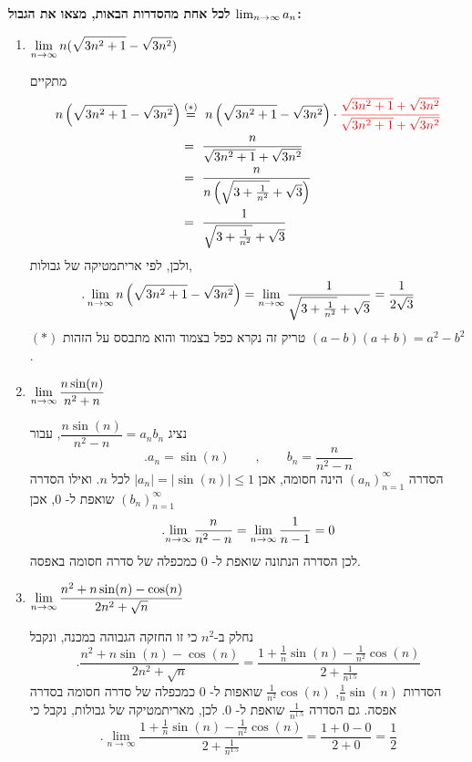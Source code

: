 \textbf{לכל אחת מהסדרות הבאות, מצאו את הגבול
$\lim_{n\to\infty} a_n$:}
\begin{enumerate}
    \item $\displaystyle{\lim_{n\to\infty}n (\sqrt{3n^2+1} - \sqrt{3n^2})}$

\begin{solbox}
    מתקיים
    \begin{align*}
        n\left(\sqrt{3n^2+1} - \sqrt{3n^2}\right)&\overset{(*)}{=}\  n\left(\sqrt{3n^2+1} - \sqrt{3n^2}\right)\cdot{\color{red}\frac{\sqrt{3n^2+1}+\sqrt{3n^2}}{\sqrt{3n^2+1}+\sqrt{3n^2}}}\\
        &=\ \frac{n}{\sqrt{3n^2+1}+\sqrt{3n^2}}\\
        &=\ \frac{n}{n\left(\sqrt{3+\frac{1}{n^2}}+\sqrt{3}\right)}\\
        &=\ \frac{1}{\sqrt{3+\frac{1}{n^2}}+\sqrt{3}}\\
    \end{align*}
    ולכן, לפי אריתמטיקה של גבולות,
    $$.\lim_{n\to\infty} n\left(\sqrt{3n^2+1} - \sqrt{3n^2}\right)=\lim_{n\to\infty} \frac{1}{\sqrt{3+\frac{1}{n^2}}+\sqrt{3}}=\frac{1}{2\sqrt{3}}$$
    $(\ast)$
    טריק זה נקרא כפל בצמוד
    והוא מתבסס על הזהות
    $(a-b)(a+b)=a^2-b^2$.
\end{solbox}

    \item $\displaystyle{\lim_{n\to\infty}\dfrac{n\sin(n)}{n^2+n}}$

\begin{solbox}
    נציג
    $\dfrac{n\sin(n)}{n^2-n}=a_nb_n$,
    עבור
    $$.a_n=\sin (n)\qquad, \qquad
    b_n=\dfrac{n}{n^2-n}$$
    הסדרה
    $(a_n)_{n=1}^\infty$
    הינה חסומה, אכן
    $|a_n|=|\sin (n)|\leq 1$
    לכל
    $n$.
    ואילו הסדרה
    $(b_n)_{n=1}^\infty$
    שואפת ל-
    $0$,
    אכן
    $$.\displaystyle{\lim_{n\to\infty}\dfrac{n}{n^2-n}}=\displaystyle{\lim_{n\to\infty}\dfrac{1}{n-1}}=0$$
    לכן הסדרה הנתונה שואפת ל-
    $0$
    כמכפלה של סדרה חסומה באפסה.
\end{solbox}

    \item $\displaystyle{\lim_{n\to\infty}\dfrac{n^2 + n\sin(n) - \cos(n)}{2n^2+\sqrt{n}}}$

\begin{solbox}
נחלק ב-$n^2$ כי זו החזקה הגבוהה במכנה, ונקבל
$$.\frac{n^2 + n \sin(n) - \cos(n)}{2n^2 + \sqrt{n}}
= \frac{1 + \frac{1}{n} \sin(n) - \frac{1}{n^2} \cos(n)} {2 + \frac{1}{n^{1.5}}}$$
הסדרות
$\frac{1}{n} \sin(n)$, $\frac{1}{n^2} \cos(n)$
שואפות ל-
$0$
כמכפלה של סדרה חסומה בסדרה אפסה.
גם הסדרה
$\frac{1}{n^{1.5}}$
שואפת ל-
$0$.
לכן, מאריתמטיקה של גבולות, נקבל כי
$$.\lim_{n \to \infty} \frac{1 + \frac{1}{n} \sin(n) - \frac{1}{n^2} \cos(n)} {2 + \frac{1}{n^{1.5}}}=\frac{1+0-0}{2+0}=\frac{1}{2}$$
\end{solbox}


\end{enumerate}
